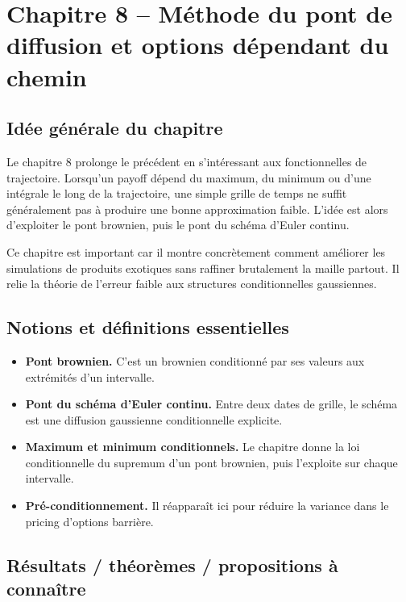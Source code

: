 \documentclass[11pt,a4paper]{article}
\begin{document}
\section{Chapitre 8 -- Méthode du pont de diffusion et options dépendant du chemin}

\subsection{Idée générale du chapitre}

Le chapitre 8 prolonge le précédent en s'intéressant aux fonctionnelles de trajectoire. Lorsqu'un payoff dépend du maximum, du minimum ou d'une intégrale le long de la trajectoire, une simple grille de temps ne suffit généralement pas à produire une bonne approximation faible. L'idée est alors d'exploiter le pont brownien, puis le pont du schéma d'Euler continu.

Ce chapitre est important car il montre concrètement comment améliorer les simulations de produits exotiques sans raffiner brutalement la maille partout. Il relie la théorie de l'erreur faible aux structures conditionnelles gaussiennes.

\subsection{Notions et définitions essentielles}

\begin{itemize}
  \item \textbf{Pont brownien.} C'est un brownien conditionné par ses valeurs aux extrémités d'un intervalle.
  \item \textbf{Pont du schéma d'Euler continu.} Entre deux dates de grille, le schéma est une diffusion gaussienne conditionnelle explicite.
  \item \textbf{Maximum et minimum conditionnels.} Le chapitre donne la loi conditionnelle du supremum d'un pont brownien, puis l'exploite sur chaque intervalle.
  \item \textbf{Pré-conditionnement.} Il réapparaît ici pour réduire la variance dans le pricing d'options barrière.
\end{itemize}

\subsection{Résultats / théorèmes / propositions à connaître}
\end{document}
